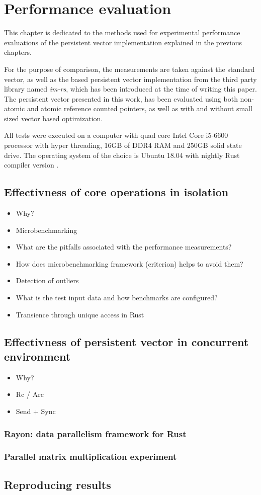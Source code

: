 \chapter{Performance evaluation}
This chapter is dedicated to the methods used for experimental performance evaluations of the persistent vector implementation explained in the previous chapters. 

For the purpose of comparison, the measurements are taken against the standard vector, as well as the \rrbtree based persistent vector implementation from the third party library named \emph{im-rs}, which has been introduced at the time of writing this paper. The persistent vector presented in this work, has been evaluated using both non-atomic and atomic reference counted pointers, as well as with and without small sized vector based optimization. 

All tests were executed on a computer with quad core Intel Core i5-6600 processor with hyper threading, 16GB of DDR4 RAM and 250GB solid state drive. The operating system of the choice is Ubuntu 18.04 with nightly Rust compiler version . 


\section{Effectivness of core operations in isolation}
\begin{itemize}
    \item Why?
    \item Microbenchmarking
    \item What are the pitfalls associated with the performance measurements?
    \item How does microbenchmarking framework (criterion) helps to avoid them?
    \item Detection of outliers
    \item What is the test input data and how benchmarks are configured?
    \item Transience through unique access in Rust
\end{itemize}

\section{Effectivness of persistent vector in concurrent environment}
\begin{itemize}
    \item Why?
    \item Rc / Arc
    \item Send + Sync
\end{itemize}
\subsection{Rayon: data parallelism framework for Rust}
\subsection{Parallel matrix multiplication experiment}
\section{Reproducing results}